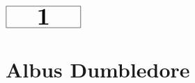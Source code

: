 \documentclass[a4paper, 10pt]{article}
\begin{document}
\begin{minipage}[t]{\textwidth}
    \vspace*{-1.5cm} %
    \begin{flushright}
        \hspace*{\fill} %
        $\boxed{\textbf{\Huge\phantom{00}1\phantom{00}}}$ %
    \end{flushright}
\end{minipage}



\section*{\huge Albus Dumbledore}
\end{document}
